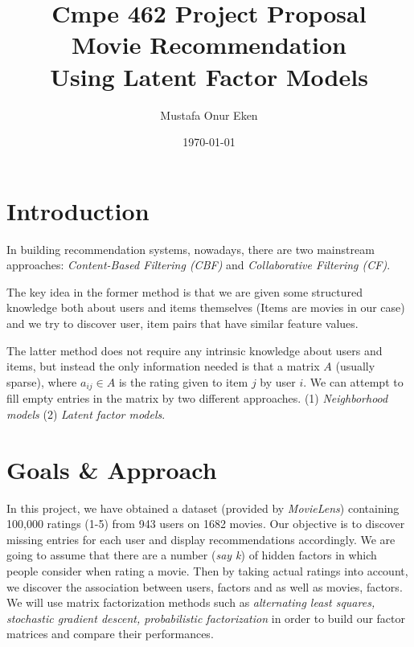 \documentclass[dvips,11pt]{article}
\begin{document}

\title{Cmpe 462 Project Proposal \\[2mm] Movie Recommendation\\ Using Latent Factor Models}
\author{Mustafa Onur Eken}
\date{\today}



\maketitle
\section{Introduction}

In building recommendation systems, nowadays, there are two mainstream approaches: \textit{Content-Based Filtering (CBF)} and \textit{Collaborative Filtering (CF)}. 

The key idea in the former method is that we are given some structured knowledge both about users and items themselves (Items are movies in our case) and we try to discover user, item pairs that have similar feature values.

The latter method does not require any intrinsic knowledge about users and items, but instead the only information needed is that a matrix $A$ (usually sparse), where $a_{ij} \in A$ is the rating given to item $j$ by user $i$. We can attempt to fill empty entries in the matrix by two different approaches. (1) \textit{Neighborhood models} (2) \textit{Latent factor models}.

\section{Goals \& Approach}

In this project, we have obtained a dataset (provided by \textit{MovieLens}) containing 100,000 ratings (1-5) from 943 users on 1682 movies. Our objective is to discover missing entries for each user and display recommendations accordingly. We are going to assume that there are a number (\textit{say k}) of hidden factors in which people consider when rating a movie. Then by taking actual ratings into account, we discover the association between users, factors and as well as movies, factors. We will use matrix factorization methods \cite{koren,mnih} such as \textit{alternating least squares, stochastic gradient descent, probabilistic factorization} in order to build our factor matrices and compare their performances.
\end{document}
